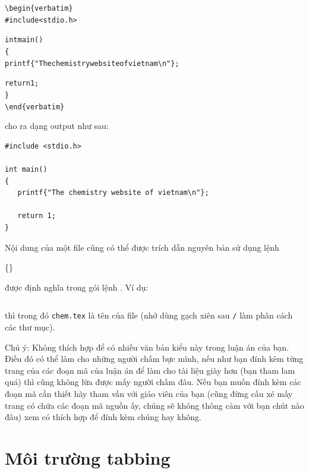 \documentclass[a4paper]{report}
\begin{document}
\begin{code}
\begin{alltt}

{\textbackslash}begin\{verbatim\}
#include <stdio.h>

int main()
\{
   printf\{"The chemistry website of vietnam{\textbackslash}n"\};

   return 1;
\}
{\textbackslash}end\{verbatim\}

\end{alltt}
\end{code}%
cho ra dạng output như sau:
\begin{result}
\begin{verbatim}
#include <stdio.h>

int main()
{
   printf{"The chemistry website of vietnam\n"};

   return 1;
}
\end{verbatim}
\end{result}

Nội dung của một file cũng có thể được trích dẫn nguyên bản sử dụng lệnh
 
\begin{definition}%
\{\}
\end{definition}%
được định nghĩa trong gói lệnh  . Ví dụ:
\begin{verbatim}

\end{verbatim}
thì trong đó \texttt{chem.tex} là tên của file (nhớ dùng gạch xiên sau  \verb|/| làm phân cách các thư mục).

Chú ý: Không thích hợp để có nhiều văn bản kiểu này trong luận án của bạn. Điều đó có thể làm cho những người chấm bực mình, nếu như bạn đính kèm từng trang của các đoạn mã của luận án để làm cho tài liệu giày hơn (bạn tham lam quá) thì cũng không lừa được mấy người chấm đâu. Nếu bạn muốn đính kèm các đoạn mã cần thiết hãy tham vấn với giáo viên của bạn (cũng đừng cấu xé mấy trang có chứa các đoạn mã nguồn ấy, chúng sẽ không thông cảm với bạn chút nào đâu) xem có thích hợp để đính kèm chúng hay không.



\section{ Môi trường tabbing}
\label{sec:tabbing}
\end{document}
